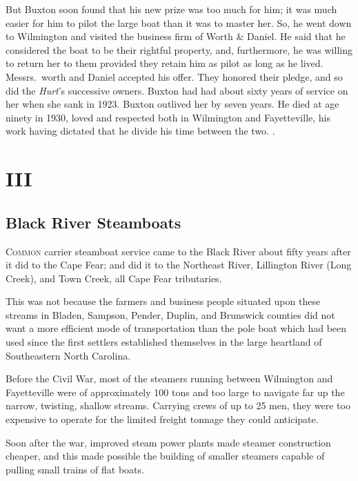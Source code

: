 \documentclass[11pt, a5paper, openright]{book}
\begin{document}
But Buxton soon found that his new prize was too much for him; it was
much easier for him to pilot the large boat than it was to master her.
So, he went down to Wilmington and visited the business firm of Worth
\& Daniel.  He said that he considered the boat to be their rightful
property, and, furthermore, he was willing to return her to them
provided they retain him as pilot as long as he lived.  Messrs.\ worth
and Daniel accepted his offer.  They honored their pledge, and so did
the \textit{Hurt}'s successive owners.  Buxton had had about sixty
years of service on her when she sank in 1923.  Buxton outlived her by
seven years.  He died at age ninety in 1930, loved and respected both
in Wilmington and Fayetteville, his work having dictated that he
divide his time between the two.  \citep[6-12-1934]{wn}.\par

\part{III}

\chapter{Black River Steamboats}

\textsc{Common} carrier steamboat service came to the Black River
about fifty years after it did to the Cape Fear; and did it to the
Northeast River, Lillington River (Long Creek), and Town Creek, all
Cape Fear tributaries.\par

This was not because the farmers and business people situated upon
these streams in Bladen, Sampson, Pender, Duplin, and Brunswick
counties did not want a more efficient mode of transportation than the
pole boat which had been used since the first settlers established
themselves in the large heartland of Southeastern North Carolina.\par

Before the Civil War, most of the steamers running between Wilmington
and Fayetteville were of approximately 100 tons and too large to
navigate far up the narrow, twisting, shallow streams.  Carrying crews
of up to 25 men, they were too expensive to operate for the limited
freight tonnage they could anticipate.\par

Soon after the war, improved steam power plants made steamer
construction cheaper, and this made possible the building of smaller
steamers capable of pulling small trains of flat boats.\par
\end{document}
